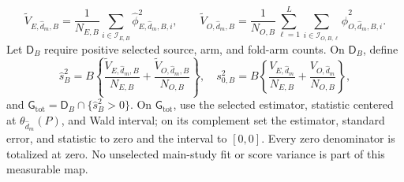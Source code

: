 \[
\widetilde V_{E,\widehat d_m,B}
=\frac1{N_{E,B}}\sum_{i\in\mathcal I_{E,B}}
\widehat\phi_{E,\widehat d_m,B,i}^2,
\qquad
\widetilde V_{O,\widehat d_m,B}
=\frac1{N_{O,B}}\sum_{\ell=1}^L\sum_{i\in\mathcal I_{O,B,\ell}}
\widehat\phi_{O,\widehat d_m,B,i}^2.
\]
Let \(\mathsf D_B\) require positive selected source, arm, and fold-arm counts. On \(\mathsf D_B\), define
\[
\widehat s_B^2=B\left\{\frac{\widetilde V_{E,\widehat d_m,B}}{N_{E,B}}+\frac{\widetilde V_{O,\widehat d_m,B}}{N_{O,B}}\right\},
\quad
s_{0,B}^2=B\left\{\frac{V_{E,\widehat d_m}}{N_{E,B}}+\frac{V_{O,\widehat d_m}}{N_{O,B}}\right\},
\]
and \(\mathsf G_{\mathrm{tot}}=\mathsf D_B\cap\{\widehat s_B^2>0\}\). On \(\mathsf G_{\mathrm{tot}}\), use the selected estimator, statistic centered at \(\theta_{\widehat d_m}(P)\), and Wald interval; on its complement set the estimator, standard error, and statistic to zero and the interval to \([0,0]\). Every zero denominator is totalized at zero. No unselected main-study fit or score variance is part of this measurable map.